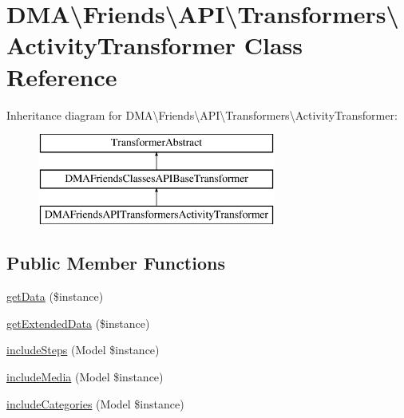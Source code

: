 \hypertarget{classDMA_1_1Friends_1_1API_1_1Transformers_1_1ActivityTransformer}{}\section{D\+M\+A\textbackslash{}Friends\textbackslash{}A\+P\+I\textbackslash{}Transformers\textbackslash{}Activity\+Transformer Class Reference}
\label{classDMA_1_1Friends_1_1API_1_1Transformers_1_1ActivityTransformer}
Inheritance diagram for D\+M\+A\textbackslash{}Friends\textbackslash{}A\+P\+I\textbackslash{}Transformers\textbackslash{}Activity\+Transformer\+:\begin{figure}[H]
\begin{center}
\leavevmode
\includegraphics[height=3.000000cm]{dc/d08/classDMA_1_1Friends_1_1API_1_1Transformers_1_1ActivityTransformer}
\end{center}
\end{figure}
\subsection*{Public Member Functions}
\begin{DoxyCompactItemize}
\item 
\hyperlink{classDMA_1_1Friends_1_1API_1_1Transformers_1_1ActivityTransformer_a0de84700162b94dc38fd224057f8a858}{get\+Data} (\$instance)
\item 
\hyperlink{classDMA_1_1Friends_1_1API_1_1Transformers_1_1ActivityTransformer_abb084721de5785ff9fdc5c4e63d45631}{get\+Extended\+Data} (\$instance)
\item 
\hyperlink{classDMA_1_1Friends_1_1API_1_1Transformers_1_1ActivityTransformer_a1ce3329a76543ad2d84bca30c6f2601d}{include\+Steps} (Model \$instance)
\item 
\hyperlink{classDMA_1_1Friends_1_1API_1_1Transformers_1_1ActivityTransformer_a96359bb45e92bd0b02ebd0a70787dd29}{include\+Media} (Model \$instance)
\item 
\hyperlink{classDMA_1_1Friends_1_1API_1_1Transformers_1_1ActivityTransformer_a081310bdabde4b8f439288dfef63a40f}{include\+Categories} (Model \$instance)
\end{DoxyCompactItemize}
